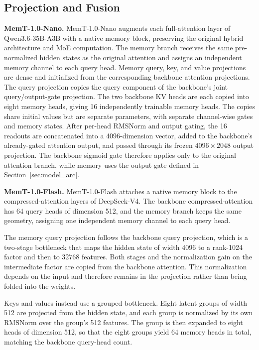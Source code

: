 \subsection{Projection and Fusion}

\textbf{MemT-1.0-Nano.}
MemT-1.0-Nano augments each full-attention layer of Qwen3.6-35B-A3B with a native memory block, preserving the original hybrid architecture and MoE computation.
The memory branch receives the same pre-normalized hidden states as the original attention and assigns an independent memory channel to each query head.
Memory query, key, and value projections are dense and initialized from the corresponding backbone attention projections.
The query projection copies the query component of the backbone's joint query/output-gate projection.
The two backbone KV heads are each copied into eight memory heads, giving 16 independently trainable memory heads.
The copies share initial values but are separate parameters, with separate channel-wise gates and memory states.
After per-head RMSNorm and output gating, the 16 readouts are concatenated into a 4096-dimension vector, added to the backbone's already-gated attention output, and passed through its frozen $4096\!\times\!2048$ output projection.
The backbone sigmoid gate therefore applies only to the original attention branch, while memory uses the output gate defined in Section~\ref{sec:model_arc}.


\textbf{MemT-1.0-Flash.}
MemT-1.0-Flash attaches a native memory block to the compressed-attention layers of DeepSeek-V4.
The backbone compressed-attention has 64 query heads of dimension 512, and the memory branch keeps the same geometry, assigning one independent memory channel to each query head.

The memory query projection follows the backbone query projection, which is a two-stage bottleneck that maps the hidden state of width 4096 to a rank-1024 factor and then to 32768 features.
Both stages and the normalization gain on the intermediate factor are copied from the backbone attention.
This normalization depends on the input and therefore remains in the projection rather than being folded into the weights.

Keys and values instead use a grouped bottleneck.
Eight latent groups of width 512 are projected from the hidden state, and each group is normalized by its own RMSNorm over the group's 512 features.
The group is then expanded to eight heads of dimension 512, so that the eight groups yield 64 memory heads in total, matching the backbone query-head count.

